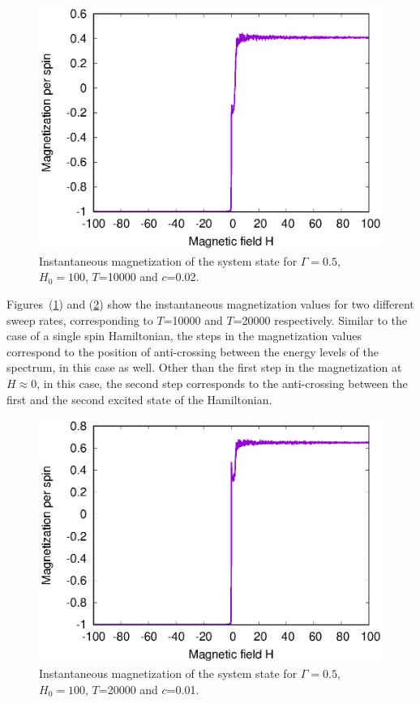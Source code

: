\documentclass[../main.tex]{subfiles}
\begin{document}
\begin{figure}[H]
  \centering
    \includegraphics[scale=0.8]{Mag_13_H100.eps}
    \caption{Instantaneous magnetization of the system state for $\Gamma=0.5$, $H_0=100$, $T$=10000 and $c$=0.02.}
  \label{fig:lz5}
 \end{figure}

Figures~(\ref{fig:lz5}) and (\ref{fig:lz6}) show the instantaneous magnetization values for two different sweep rates, corresponding to $T$=10000 and $T$=20000 respectively. Similar to the case of a single spin Hamiltonian, the steps in the magnetization values correspond to the position of anti-crossing between the energy levels of the spectrum, in this case as well. Other than the first step in the magnetization at $H \approx 0$, in this case, the second step corresponds to the anti-crossing between the first and the second excited state of the Hamiltonian.

 \begin{figure}[H]
  \centering
    \includegraphics[scale=0.8]{Mag_9_H100.eps}
    \caption{Instantaneous magnetization of the system state for $\Gamma=0.5$, $H_0=100$, $T$=20000 and $c$=0.01.}
  \label{fig:lz6}
\end{figure}
\end{document}
